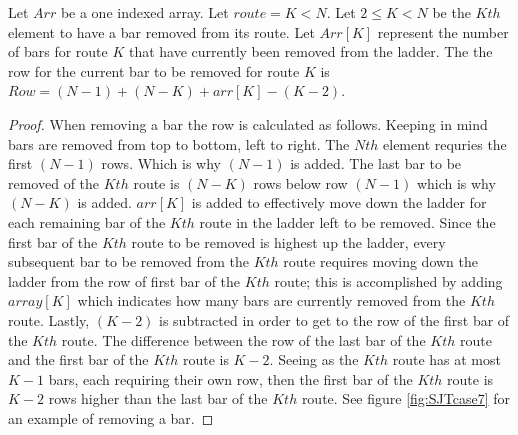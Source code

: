 

\begin{lemma}
  Let $Arr$ be a one indexed array. Let $route=K<N$. Let $2 \leq K < N$ be the $Kth$ element to have a bar removed from its route. 
  Let $Arr[K]$ represent the number of bars for route $K$ that have currently been removed from the ladder. 
  The the row for the current bar to be removed for route $K$ is $Row=(N-1) + (N-K) + arr[K] - (K-2)$.
\end{lemma}
\begin{proof}
  When removing a bar the row is calculated as follows. Keeping in mind bars are removed from top to bottom, left to right.
  The $Nth$ element requries the first $(N-1)$ rows. Which is why $(N-1)$ is added. The last bar to be removed of the $Kth$ route is $(N-K)$
  rows below row $(N-1)$ which is why $(N-K)$ is added. $arr[K]$ is added to effectively move down the ladder 
  for each remaining bar of the $Kth$ route in the ladder left to be removed. Since the first bar of the $Kth$ route 
  to be removed is highest up the ladder, every subsequent bar to be removed from the $Kth$ route requires 
  moving down the ladder from the row of first bar of the $Kth$ route; this is accomplished by adding $array[K]$ which 
  indicates how many bars are currently removed from the $Kth$ route. Lastly, $(K-2)$  is subtracted in order to 
  get to the row of the first bar of the $Kth$ route. The difference between the row of the last bar of the $Kth$ route and 
  the first bar of the $Kth$ route is $K-2$. Seeing as the $Kth$ route has at most $K-1$ bars, each requiring their own row, then the 
  first bar of the $Kth$ route is $K-2$ rows higher than the last bar of the $Kth$ route. See figure \ref{fig:SJTcase7} for 
  an example of removing a bar.\pagebreak
\end{proof}

